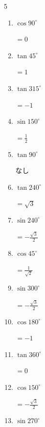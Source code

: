 \begin{multicols}{5}
\begin{enumerate}
        $\displaystyle =0$

  \item $\displaystyle \cos{90^\circ}$

        $\displaystyle =0$

  \item $\displaystyle \tan{45^\circ}$

        $\displaystyle =1$

  \item $\displaystyle \tan{315^\circ}$

        $\displaystyle =-1$

  \item $\displaystyle \sin{150^\circ}$

        $\displaystyle =\frac{1}{2}$

  \item $\displaystyle \tan{90^\circ}$

        $\displaystyle なし$

  \item $\displaystyle \tan{240^\circ}$

        $\displaystyle =\sqrt{3}$

  \item $\displaystyle \sin{240^\circ}$

        $\displaystyle =-\frac{\sqrt{3}}{2}$

  \item $\displaystyle \cos{45^\circ}$

        $\displaystyle =\frac{1}{\sqrt{2}}$

  \item $\displaystyle \sin{300^\circ}$

        $\displaystyle =-\frac{\sqrt{3}}{2}$

  \item $\displaystyle \cos{180^\circ}$

        $\displaystyle =-1$

  \item $\displaystyle \tan{360^\circ}$

        $\displaystyle =0$

\columnbreak %

  \item $\displaystyle \cos{150^\circ}$

        $\displaystyle =-\frac{\sqrt{3}}{2}$

  \item $\displaystyle \sin{270^\circ}$


\end{enumerate}
\end{multicols}
